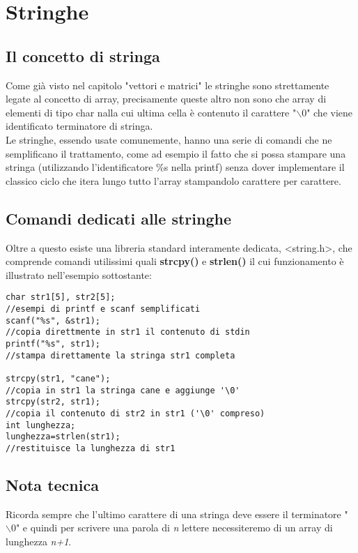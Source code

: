 \chapter{Stringhe}

\section{Il concetto di stringa}
Come già visto nel capitolo "vettori e matrici" le stringhe sono strettamente legate al concetto di array, precisamente queste altro non sono che array di elementi di tipo char nalla cui ultima cella è contenuto il carattere "$\backslash0$" che viene identificato terminatore di stringa.\\Le stringhe, essendo usate comunemente, hanno una serie di comandi che ne semplificano il trattamento, come ad esempio il fatto che si possa stampare una stringa (utilizzando l'identificatore \%s nella printf) senza dover implementare il classico ciclo che itera lungo tutto l'array stampandolo carattere per carattere. 
\section{Comandi dedicati alle stringhe}
Oltre a questo esiste una libreria standard interamente dedicata, <string.h>, che comprende comandi utilissimi quali \textbf{strcpy()} e \textbf{strlen()} il cui funzionamento è illustrato nell'esempio sottostante:
\begin{lstlisting}[title={Comandi comodi per trattare le stringhe}]
char str1[5], str2[5];
//esempi di printf e scanf semplificati
scanf("%s", &str1);
//copia direttmente in str1 il contenuto di stdin
printf("%s", str1);
//stampa direttamente la stringa str1 completa

strcpy(str1, "cane");
//copia in str1 la stringa cane e aggiunge '\0'
strcpy(str2, str1);
//copia il contenuto di str2 in str1 ('\0' compreso)
int lunghezza;
lunghezza=strlen(str1);
//restituisce la lunghezza di str1
\end{lstlisting}
\section{Nota tecnica}
Ricorda sempre che l'ultimo carattere di una stringa deve essere il terminatore "$\backslash0$" e quindi per scrivere una parola di \textit{n} lettere necessiteremo di un array di lunghezza \textit{n+1}.